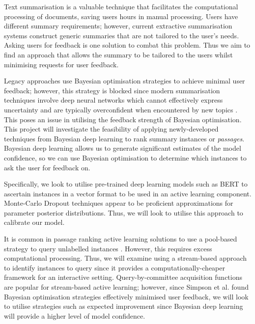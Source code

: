 Text summarisation is a valuable technique that facilitates the computational processing of documents, saving users hours in manual processing. Users have different summary requirements; however, current extractive summarisation systems construct generic summaries that are not tailored to the user's needs. Asking users for feedback is one solution to combat this problem. Thus we aim to find an approach that allows the summary to be tailored to the users whilst minimising requests for user feedback.

\medbreak	
Legacy approaches use Bayesian optimisation \cite{Simpson19} strategies to achieve minimal user feedback; however, this strategy is blocked since modern summarisation techniques involve deep neural networks which cannot effectively express uncertainty and are typically overconfident when encountered by new topics \cite{Xu19}. This poses an issue in utilising the feedback strength of Bayesian optimisation. This project will investigate the feasibility of applying newly-developed techniques from Bayesian deep learning \cite{Wilson20} to rank summary instances or \emph{passages}. Bayesian deep learning allows us to generate significant estimates of the model confidence, so we can use Bayesian optimisation to determine which instances to ask the user for feedback on.

\medbreak		
Specifically, we look to utilise pre-trained deep learning models such as BERT \cite{Navin21} to ascertain instances in a vector format to be used in an active learning component. Monte-Carlo Dropout \cite{Gal15} techniques appear to be proficient approximations for parameter posterior distributions. Thus, we will look to utilise this approach to calibrate our model.

\medbreak
It is common in passage ranking active learning solutions to use a pool-based strategy to query unlabelled instances \cite{EinDor20}. However, this requires excess computational processing. Thus, we will examine using a stream-based approach to identify instances to query since it provides a computationally-cheaper framework for an interactive setting. Query-by-committee acquisition functions are popular for stream-based active learning; however, since Simpson et al. \cite{Simpson19} found Bayesian optimisation strategies effectively minimised user feedback, we will look to utilise strategies such as expected improvement since Bayesian deep learning will provide a higher level of model confidence. 
